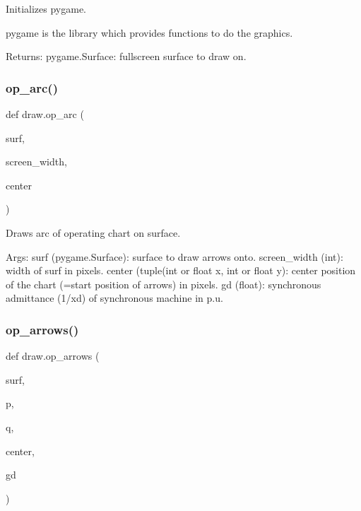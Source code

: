 \begin{DoxyVerb}Initializes pygame.

pygame is the library which provides functions to do the graphics.

Returns:
    pygame.Surface: fullscreen surface to draw on.
\end{DoxyVerb}
 \mbox{\label{namespacedraw_af5dc748bd3063bc390fded916ae2a6d2}} 
\subsubsection{\texorpdfstring{op\+\_\+arc()}{op\_arc()}}
{\footnotesize\ttfamily def draw.\+op\+\_\+arc (\begin{DoxyParamCaption}\item[{}]{surf,  }\item[{}]{screen\+\_\+width,  }\item[{}]{center }\end{DoxyParamCaption})}

\begin{DoxyVerb}Draws arc of operating chart on surface.

Args:
    surf (pygame.Surface): surface to draw arrows onto.
    screen_width (int): width of surf in pixels.
    center (tuple(int or float x, int or float y): center position of
        the chart (=start position of arrows) in pixels.
    gd (float): synchronous admittance (1/xd) of synchronous machine
        in p.u.\end{DoxyVerb}
 \mbox{\label{namespacedraw_a277cf79dca33663a9bcc173931660ac9}} 
\subsubsection{\texorpdfstring{op\+\_\+arrows()}{op\_arrows()}}
{\footnotesize\ttfamily def draw.\+op\+\_\+arrows (\begin{DoxyParamCaption}\item[{}]{surf,  }\item[{}]{p,  }\item[{}]{q,  }\item[{}]{center,  }\item[{}]{gd }\end{DoxyParamCaption})}

